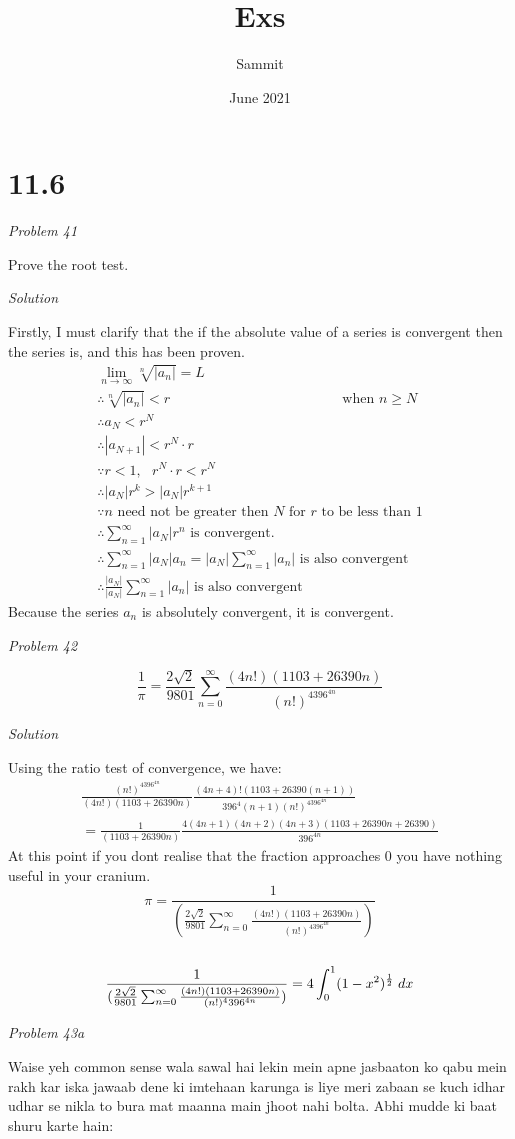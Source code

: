 \documentclass{article}
\title{Exs}
\author{Sammit }
\date{June 2021}
\newcommand{\qstf}[1]{\begin{center}\textit{Problem #1}\end{center}}
\newcommand{\qst}[1]{\newpage \begin{center}\textit{Problem #1}\end{center}}
\newcommand{\sol}{\begin{center}\textit{Solution}\end{center}}
\newcommand{\thf}{\\\therefore}
\newcommand{\dx}{\hspace{1mm}dx}
\begin{document}
\maketitle

\section*{11.6}
\qstf{41}
Prove the root test.
\sol

Firstly, I must clarify that the if the absolute value of a series is convergent then the series is, and this has been proven.
\begin{gather*}
\lim_{n\to\infty}\sqrt[n]{|a_n|}=L
\\\therefore \sqrt[n]{|a_n|}<r\text{ }\text{ }\text{ }\text{ }\text{ }\text{ }\text{ }\text{ }\text{ }\text{ }\text{ }\text{ }\text{ }\text{ }\text{ }\text{ }\text{ }\text{ }\text{  when }n\geq N
\\\therefore a_N<r^N
\thf |a_{N+1}|<r^N \cdot r
\\\because r<1,\text{ } r^N \cdot r<r^N
\thf |a_{N}|r^{k}>|a_N|r^{k+1}
\\\because n \text{ need not be greater then }N\text{ for }r\text{ to be less than }1
\\\therefore \sum^{\infty}_{n=1}|a_N|r^{n} \text{ is convergent.}
\thf \sum^{\infty}_{n=1}|a_N|a_n =|a_N|\sum^{\infty}_{n=1}|a_n| \text{ is also convergent}
\thf\frac{|a_N|}{|a_N|}\sum^{\infty}_{n=1}|a_n| \text{ is also convergent}
\end{gather*}
Because the series $a_n$ is absolutely convergent, it is convergent.
\qst{42}
$$\frac{1}{\pi}=\frac{2\sqrt{2}}{9801}\sum^{\infty}_{n=0}\frac{(4n!)(1103+26390n)}{(n!)^4396^{4n}}$$
\sol
Using the ratio test of convergence, we have:
\begin{gather*}
\frac{(n!)^4396^{4n}}{(4n!)(1103+26390n)}\frac{(4n+4)!(1103+26390(n+1))}{396^4(n+1)(n!)^4396^{4n}}
\\=\frac{1}{(1103+26390n)}\frac{4(4n+1)(4n+2)(4n+3)(1103+26390n+26390)}{396^{4n}}
\end{gather*}
At this point if you dont realise that the fraction approaches 0 you have nothing useful in your cranium.
\newpage$$\pi = \frac{1}{(\frac{2\sqrt{2}}{9801}\sum^{\infty}_{n=0}\frac{(4n!)(1103+26390n)}{(n!)^4396^{4n}})}$$
\\$$ \frac{1}{(\frac{2\sqrt{2}}{9801}\sum^{\infty}_{n=0}\frac{(4n!)(1103+26390n)}{(n!)^4396^{4n}})}=4\int^{1}_{0}(1-x^2)^{\frac{1}{2}}\dx$$
\qst{43a}
Waise yeh common sense wala sawal hai lekin mein apne jasbaaton ko qabu mein rakh kar iska jawaab dene ki imtehaan karunga is liye meri zabaan se kuch idhar udhar se nikla to bura mat maanna main jhoot nahi bolta. Abhi mudde ki baat shuru karte hain:
\end{document}
